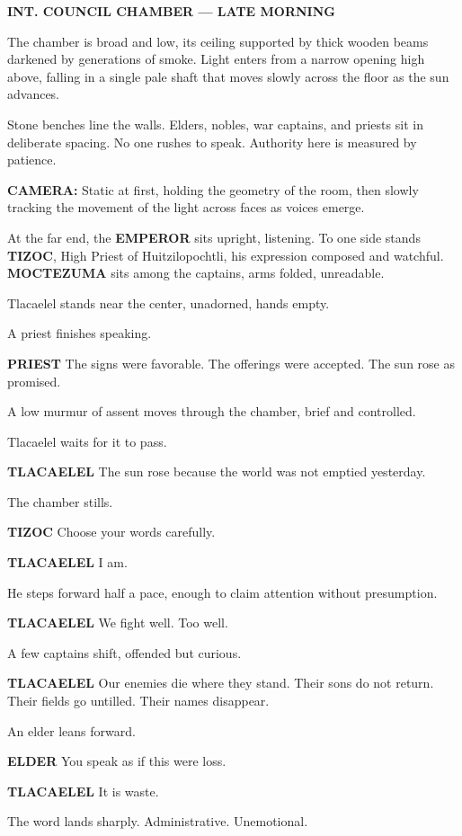 \documentclass[12pt]{article}
\begin{document}
\textbf{INT. COUNCIL CHAMBER — LATE MORNING}

The chamber is broad and low, its ceiling supported by thick wooden beams darkened by generations of smoke. Light enters from a narrow opening high above, falling in a single pale shaft that moves slowly across the floor as the sun advances.

Stone benches line the walls. Elders, nobles, war captains, and priests sit in deliberate spacing. No one rushes to speak. Authority here is measured by patience.

\textbf{CAMERA:} Static at first, holding the geometry of the room, then slowly tracking the movement of the light across faces as voices emerge.

At the far end, the \textbf{EMPEROR} sits upright, listening. To one side stands \textbf{TIZOC}, High Priest of Huitzilopochtli, his expression composed and watchful. \textbf{MOCTEZUMA} sits among the captains, arms folded, unreadable.

Tlacaelel stands near the center, unadorned, hands empty.

A priest finishes speaking.

\textbf{PRIEST}  
The signs were favorable.  
The offerings were accepted.  
The sun rose as promised.

A low murmur of assent moves through the chamber, brief and controlled.

Tlacaelel waits for it to pass.

\textbf{TLACAELEL}  
The sun rose because the world was not emptied yesterday.

The chamber stills.

\textbf{TIZOC}  
Choose your words carefully.

\textbf{TLACAELEL}  
I am.

He steps forward half a pace, enough to claim attention without presumption.

\textbf{TLACAELEL}  
We fight well.  
Too well.

A few captains shift, offended but curious.

\textbf{TLACAELEL}  
Our enemies die where they stand.  
Their sons do not return.  
Their fields go untilled.  
Their names disappear.

An elder leans forward.

\textbf{ELDER}  
You speak as if this were loss.

\textbf{TLACAELEL}  
It is waste.

The word lands sharply. Administrative. Unemotional.
\end{document}
